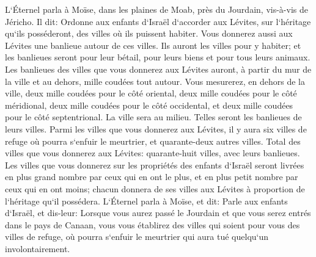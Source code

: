 \verse L`Éternel parla à Moïse, dans les plaines de Moab, près du Jourdain, vis-à-vis de Jéricho. Il dit: 
\verse Ordonne aux enfants d`Israël d`accorder aux Lévites, sur l`héritage qu`ils posséderont, des villes où ils puissent habiter. Vous donnerez aussi aux Lévites une banlieue autour de ces villes. 
\verse Ils auront les villes pour y habiter; et les banlieues seront pour leur bétail, pour leurs biens et pour tous leurs animaux. 
\verse Les banlieues des villes que vous donnerez aux Lévites auront, à partir du mur de la ville et au dehors, mille coudées tout autour. 
\verse Vous mesurerez, en dehors de la ville, deux mille coudées pour le côté oriental, deux mille coudées pour le côté méridional, deux mille coudées pour le côté occidental, et deux mille coudées pour le côté septentrional. La ville sera au milieu. Telles seront les banlieues de leurs villes. 
\verse Parmi les villes que vous donnerez aux Lévites, il y aura six villes de refuge où pourra s`enfuir le meurtrier, et quarante-deux autres villes. 
\verse Total des villes que vous donnerez aux Lévites: quarante-huit villes, avec leurs banlieues. 
\verse Les villes que vous donnerez sur les propriétés des enfants d`Israël seront livrées en plus grand nombre par ceux qui en ont le plus, et en plus petit nombre par ceux qui en ont moins; chacun donnera de ses villes aux Lévites à proportion de l`héritage qu`il possédera. 
\verse L`Éternel parla à Moïse, et dit: 
\verse Parle aux enfants d`Israël, et dis-leur: Lorsque vous aurez passé le Jourdain et que vous serez entrés dans le pays de Canaan, 
\verse vous vous établirez des villes qui soient pour vous des villes de refuge, où pourra s`enfuir le meurtrier qui aura tué quelqu`un involontairement. 
